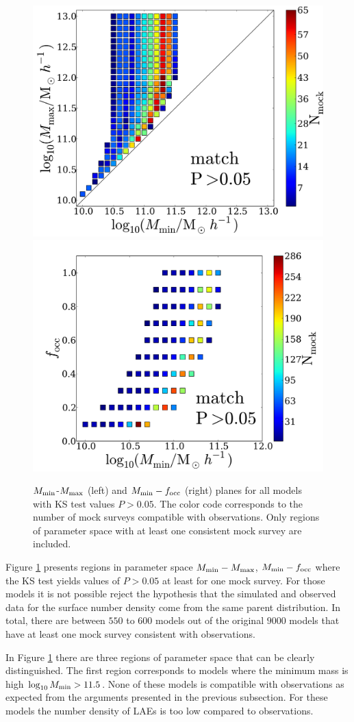 \documentclass[usenatbib]{mn2e}
\begin{document}
\begin{figure}
\begin{center}
\includegraphics[width=0.46\linewidth,angle=0]{./plots/Fig2_match_P5.pdf}
\vspace{5mm}
\includegraphics[width=0.49\linewidth,angle=0]{./plots/Fig3_match_P5.pdf}
\end{center} 
\caption{$M_{\rm min}$-$M_{\rm max}$ (left) and $M_{\rm    min}-f_{\rm
    occ}$ (right) planes for all models with  KS test values
  $P>0.05$. The color code corresponds to the number of  mock surveys
  compatible with observations. Only regions of parameter  space with
  at least one consistent mock survey are  included. \label{fig:landscape}}     
\end{figure}


Figure \ref{fig:landscape} presents regions in parameter space $M_{\rm
min}-M_{\rm max}$, $M_{\rm min}-f_{\rm occ}$ where the KS test yields
values of $P>0.05$ at least for one mock survey. For those models it
is not possible reject the hypothesis that the simulated and observed
data for the surface number density come from the same parent
distribution. In total, there are between $550$ to $600$ models out of
the original $9000$ models that have at least one mock survey
consistent with observations.  

In Figure \ref{fig:landscape} there are three regions of parameter
space that can be clearly distinguished. The first region corresponds
to models where the minimum mass is high $\log_{10}M_{\rm min}>
11.5$. None of these models is compatible with observations as expected
from the arguments presented in the previous subsection. For these
models the number density of LAEs is too low compared to observations.
 
\end{document}
